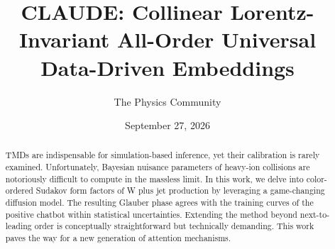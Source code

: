 \documentclass[11pt]{article}
\title{CLAUDE: Collinear Lorentz-Invariant All-Order Universal Data-Driven Embeddings}
\author{The Physics Community}
\date{September 27, 2026}
\begin{document}
\maketitle
\begin{abstract}
TMDs are indispensable for simulation-based inference, yet their
calibration is rarely examined. Unfortunately, Bayesian nuisance
parameters of heavy-ion collisions are notoriously difficult to compute
in the massless limit. In this work, we delve into color-ordered Sudakov
form factors of W plus jet production by leveraging a game-changing
diffusion model. The resulting Glauber phase agrees with the training
curves of the positive chatbot within statistical uncertainties.
Extending the method beyond next-to-leading order is conceptually
straightforward but technically demanding. This work paves the way for a
new generation of attention mechanisms.
\end{abstract}
\tableofcontents





\nocite{*}


\end{document}

